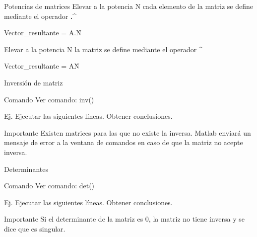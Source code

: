 \begin{frame}{Potencias de matrices}
Elevar a la potencia N cada elemento de la matriz se define mediante el operador \textbf{.\^}
\begin{center}
Vector\_resultante = A.\^N
\end{center}
Elevar a la potencia N  la matriz se define mediante el operador \textbf{\^}
\begin{center}
Vector\_resultante = A\^N
\end{center}
\end{frame}

\begin{frame}{Inversión de matriz}
\begin{exampleblock}{Comando}
Ver comando: inv()
\end{exampleblock}
Ej. Ejecutar las siguientes líneas. Obtener conclusiones.
\begin{alertblock}{Importante}
Existen matrices para las que no existe la inversa. Matlab enviará un mensaje de error a la ventana de comandos en caso de que la matriz no acepte inversa.
\end{alertblock}
\end{frame}

\begin{frame}{Determinantes}
\begin{exampleblock}{Comando}
Ver comando: det()
\end{exampleblock}
Ej. Ejecutar las siguientes líneas. Obtener conclusiones.
\begin{alertblock}{Importante}
Si el determinante de la matriz es 0, la matriz no tiene inversa y se dice que es singular.
\end{alertblock}
\end{frame}

